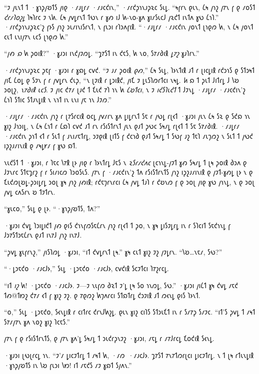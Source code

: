 “𐑲 𐑢𐑧𐑯𐑑 𐑑 ·𐑣𐑪𐑜𐑢𐑹𐑑𐑕 𐑢𐑦𐑞 ·𐑥𐑨𐑛𐑩𐑥 ·𐑥𐑨𐑤𐑒𐑦𐑯,” ·𐑥𐑩𐑒𐑜𐑪𐑯𐑨𐑜𐑷𐑤 𐑕𐑧𐑛. “𐑰𐑝𐑩𐑯 𐑞𐑧𐑯, 𐑖𐑰 𐑢𐑪𐑟 𐑢𐑳𐑯 𐑝 𐑞 𐑥𐑴𐑕𐑑 \emph{𐑒𐑩𐑥𐑐𐑴𐑟𐑛} 𐑐𐑰𐑐𐑩𐑤 𐑲 𐑯𐑿. 𐑖𐑰 𐑢𐑫𐑛𐑩𐑯𐑑 𐑑𐑻𐑯 𐑩 𐑣𐑺 𐑦𐑓 𐑿-𐑯𐑴-𐑣𐑵 𐑣𐑦𐑥𐑕𐑧𐑤𐑓 𐑢𐑷𐑒𐑑 𐑦𐑯𐑑𐑵 𐑣𐑻 𐑖𐑪𐑐.” ·𐑥𐑩𐑒𐑜𐑪𐑯𐑨𐑜𐑷𐑤'𐑟 𐑝𐑶𐑕 𐑢𐑪𐑟 𐑮𐑧𐑥𐑦𐑯𐑦𐑕𐑩𐑯𐑑, 𐑯 𐑝𐑧𐑮𐑦 𐑩𐑐𐑮𐑵𐑝𐑦𐑙. “·𐑥𐑨𐑛𐑩𐑥 ·𐑥𐑨𐑤𐑒𐑦𐑯 𐑢𐑴𐑯𐑑 𐑚𐑪𐑞𐑼 𐑿, 𐑯 𐑖𐑰 𐑢𐑴𐑯𐑑 𐑤𐑧𐑑 𐑧𐑯𐑦𐑢𐑳𐑯 𐑧𐑤𐑕 𐑚𐑪𐑞𐑼 𐑿.”

“𐑢𐑺 \emph{𐑸} 𐑿 𐑜𐑴𐑦𐑙?” ·𐑣𐑨𐑮𐑦 𐑦𐑯𐑒𐑢𐑲𐑼𐑛. “𐑡𐑳𐑕𐑑 𐑦𐑯 𐑒𐑱𐑕, 𐑿 𐑯𐑴, 𐑕𐑳𐑥𐑔𐑦𐑙 \emph{𐑛𐑳𐑟} 𐑣𐑨𐑐𐑩𐑯.”

·𐑥𐑩𐑒𐑜𐑪𐑯𐑨𐑜𐑷𐑤 𐑜𐑱𐑝 ·𐑣𐑨𐑮𐑦 𐑩 𐑣𐑸𐑛 𐑤𐑫𐑒. “𐑲 𐑨𐑥 𐑜𐑴𐑦𐑙 \emph{𐑞𐑺},” 𐑖𐑰 𐑕𐑧𐑛, 𐑐𐑶𐑯𐑑𐑦𐑙 𐑨𐑑 𐑩 𐑚𐑦𐑤𐑛𐑦𐑙 𐑩𐑒𐑮𐑪𐑕 𐑞 𐑕𐑑𐑮𐑰𐑑 𐑢𐑦𐑗 𐑖𐑴𐑛 𐑞 𐑕𐑲𐑯 𐑝 𐑩 𐑢𐑫𐑛𐑩𐑯 𐑒𐑧𐑜, “𐑯 𐑚𐑲𐑦𐑙 𐑩 𐑛𐑮𐑦𐑙𐑒, 𐑢𐑦𐑗 𐑲 𐑛𐑧𐑕𐑐𐑼𐑩𐑑𐑤𐑦 𐑯𐑰𐑛. \emph{𐑿} 𐑸 𐑑 𐑜𐑧𐑑 𐑓𐑦𐑑𐑩𐑛 𐑓 𐑘𐑹 𐑮𐑴𐑚𐑟, \emph{𐑯𐑳𐑔𐑦𐑙 𐑧𐑤𐑕}. 𐑲 𐑢𐑦𐑤 𐑒𐑳𐑥 𐑚𐑨𐑒 𐑑 𐑗𐑧𐑒 𐑳𐑐 𐑪𐑯 𐑿 \emph{𐑖𐑹𐑑𐑤𐑦}, 𐑯 𐑲 \emph{𐑦𐑒𐑕𐑐𐑧𐑒𐑑} 𐑑 𐑓𐑲𐑯𐑛 ·𐑥𐑨𐑛𐑩𐑥 ·𐑥𐑨𐑤𐑒𐑦𐑯'𐑟 𐑖𐑪𐑐 𐑕𐑑𐑦𐑤 𐑕𐑑𐑨𐑯𐑛𐑦𐑙 𐑯 𐑯𐑪𐑑 𐑦𐑯 𐑧𐑯𐑦 𐑢𐑱 𐑪𐑯 𐑓𐑲𐑼.”

·𐑥𐑨𐑛𐑩𐑥 ·𐑥𐑨𐑤𐑒𐑦𐑯 𐑢𐑪𐑟 𐑩 𐑚𐑳𐑕𐑩𐑤𐑦𐑙 𐑴𐑤𐑛 𐑢𐑫𐑥𐑩𐑯 𐑣𐑵 𐑛𐑦𐑛𐑩𐑯𐑑 𐑕𐑱 𐑩 𐑢𐑻𐑛 𐑩𐑚𐑬𐑑 ·𐑣𐑨𐑮𐑦 𐑢𐑧𐑯 𐑖𐑰 𐑕𐑷 𐑞 𐑕𐑒𐑸 𐑪𐑯 𐑣𐑦𐑟 𐑓𐑪𐑮𐑦𐑛, 𐑯 𐑖𐑰 𐑖𐑪𐑑 𐑩 𐑖𐑸𐑐 𐑤𐑫𐑒 𐑨𐑑 𐑩𐑯 𐑩𐑕𐑦𐑕𐑑𐑩𐑯𐑑 𐑢𐑧𐑯 𐑞𐑨𐑑 𐑜𐑻𐑤 𐑕𐑰𐑥𐑛 𐑩𐑚𐑬𐑑 𐑑 𐑕𐑱 𐑕𐑳𐑥𐑔𐑦𐑙. ·𐑥𐑨𐑛𐑩𐑥 ·𐑥𐑨𐑤𐑒𐑦𐑯 𐑜𐑪𐑑 𐑬𐑑 𐑩 𐑕𐑧𐑑 𐑝 𐑨𐑯𐑦𐑥𐑱𐑑𐑩𐑛, 𐑮𐑲𐑞𐑦𐑙 𐑚𐑦𐑑𐑕 𐑝 𐑒𐑤𐑪𐑔 𐑞𐑨𐑑 𐑕𐑰𐑥𐑛 𐑑 𐑕𐑻𐑝 𐑨𐑟 𐑑𐑱𐑐 𐑥𐑧𐑠𐑼𐑟 𐑯 𐑕𐑧𐑑 𐑑 𐑢𐑻𐑒 𐑦𐑜𐑟𐑨𐑥𐑦𐑯𐑦𐑙 𐑞 𐑥𐑰𐑛𐑾𐑥 𐑝 𐑣𐑻 𐑸𐑑.

𐑯𐑧𐑒𐑕𐑑 𐑑 ·𐑣𐑨𐑮𐑦, 𐑩 𐑐𐑱𐑤 𐑘𐑳𐑙 𐑚𐑶 𐑢𐑦𐑞 𐑩 𐑐𐑶𐑯𐑑𐑩𐑛 𐑓𐑱𐑕 𐑯 \emph{𐑷𐑕𐑩𐑥𐑒𐑵𐑤} 𐑚𐑤𐑪𐑯𐑛-𐑢𐑲𐑑 𐑣𐑺 𐑕𐑰𐑥𐑛 𐑑 𐑚𐑰 𐑜𐑴𐑦𐑙 𐑔𐑮𐑵 𐑞 𐑓𐑲𐑯𐑩𐑤 𐑕𐑑𐑱𐑡𐑩𐑟 𐑝 𐑩 𐑕𐑦𐑥𐑦𐑤𐑼 𐑐𐑮𐑴𐑕𐑧𐑕. 𐑢𐑳𐑯 𐑝 ·𐑥𐑨𐑤𐑒𐑦𐑯'𐑟 𐑑𐑵 𐑩𐑕𐑦𐑕𐑑𐑩𐑯𐑑𐑕 𐑢𐑪𐑟 𐑦𐑜𐑟𐑨𐑥𐑦𐑯𐑦𐑙 𐑞 𐑢𐑲𐑑-𐑣𐑺𐑛 𐑚𐑶 𐑯 𐑞 𐑗𐑧𐑒𐑼𐑚𐑹𐑛-𐑜𐑮𐑦𐑛𐑩𐑛 𐑮𐑴𐑚 𐑣𐑰 𐑢𐑪𐑟 𐑢𐑺𐑦𐑙; 𐑩𐑒𐑱𐑠𐑩𐑯𐑩𐑤𐑦 𐑖𐑰 𐑢𐑫𐑛 𐑑𐑨𐑐 𐑩 𐑒𐑹𐑯𐑼 𐑝 𐑞 𐑮𐑴𐑚 𐑢𐑦𐑞 𐑣𐑻 𐑢𐑪𐑯𐑛, 𐑯 𐑞 𐑮𐑴𐑚 𐑢𐑫𐑛 𐑤𐑵𐑕𐑩𐑯 𐑹 𐑑𐑲𐑑𐑩𐑯.

“𐑣𐑧𐑤𐑴,” 𐑕𐑧𐑛 𐑞 𐑚𐑶. “·𐑣𐑪𐑜𐑢𐑹𐑑𐑕, 𐑑𐑵?”

·𐑣𐑨𐑮𐑦 𐑒𐑫𐑛 𐑐𐑮𐑦𐑛𐑦𐑒𐑑 𐑢𐑺 𐑞𐑦𐑕 𐑒𐑪𐑯𐑝𐑼𐑕𐑱𐑖𐑩𐑯 𐑢𐑪𐑟 𐑩𐑚𐑬𐑑 𐑑 𐑜𐑴, 𐑯 𐑣𐑰 𐑛𐑦𐑕𐑲𐑛𐑩𐑛 𐑦𐑯 𐑩 𐑕𐑐𐑤𐑦𐑑 𐑕𐑱𐑒𐑪𐑯𐑛 𐑝 𐑓𐑮𐑳𐑕𐑑𐑮𐑱𐑖𐑩𐑯 𐑞𐑨𐑑 𐑦𐑯𐑳𐑓 𐑢𐑪𐑟 𐑦𐑯𐑳𐑓.

“𐑜𐑫𐑛 𐑣𐑧𐑝𐑩𐑯𐑟,” 𐑢𐑦𐑕𐑐𐑼𐑛 ·𐑣𐑨𐑮𐑦, “𐑦𐑑 𐑒𐑫𐑛𐑩𐑯𐑑 𐑚𐑰.” 𐑣𐑰 𐑤𐑧𐑑 𐑣𐑦𐑟 𐑲𐑟 𐑢𐑲𐑛𐑩𐑯. “𐑘𐑹…𐑯𐑱𐑥, 𐑕𐑻?”

“·𐑛𐑮𐑱𐑒𐑴 ·𐑥𐑨𐑤𐑓𐑶,” 𐑕𐑧𐑛 ·𐑛𐑮𐑱𐑒𐑴 ·𐑥𐑨𐑤𐑓𐑶, 𐑤𐑫𐑒𐑦𐑙 𐑕𐑤𐑲𐑑𐑤𐑦 𐑐𐑳𐑟𐑩𐑤𐑛.

“𐑦𐑑 \emph{𐑦𐑟} 𐑿! ·𐑛𐑮𐑱𐑒𐑴 ·𐑥𐑨𐑤𐑓𐑶. 𐑲—𐑲 𐑯𐑧𐑝𐑼 𐑔𐑷𐑑 𐑲'𐑛 𐑚𐑰 𐑕𐑴 𐑪𐑯𐑼𐑛, 𐑕𐑻.” ·𐑣𐑨𐑮𐑦 𐑢𐑦𐑖𐑑 𐑣𐑰 𐑒𐑫𐑛 𐑥𐑱𐑒 𐑑𐑺@𐑑𐑽𐑟 𐑒𐑳𐑥 𐑬𐑑 𐑝 𐑣𐑦𐑟 𐑲𐑟. 𐑞 𐑳𐑞𐑼𐑟 𐑿𐑠𐑵𐑩𐑤𐑦 𐑕𐑑𐑸𐑑𐑩𐑛 𐑒𐑮𐑲𐑦𐑙 𐑨𐑑 𐑼𐑬𐑯𐑛 𐑞𐑦𐑕 𐑐𐑶𐑯𐑑.

“𐑴,” 𐑕𐑧𐑛 ·𐑛𐑮𐑱𐑒𐑴, 𐑕𐑬𐑯𐑛𐑦𐑙 𐑩 𐑤𐑦𐑑𐑩𐑤 𐑒𐑩𐑯𐑓𐑿𐑟𐑛. 𐑞𐑧𐑯 𐑣𐑦𐑟 𐑤𐑦𐑐𐑕 𐑕𐑑𐑮𐑧𐑗𐑑 𐑦𐑯 𐑩 𐑕𐑥𐑳𐑜 𐑕𐑥𐑲𐑤. “𐑦𐑑'𐑕 𐑜𐑫𐑛 𐑑 𐑥𐑰𐑑 𐑕𐑳𐑥𐑢𐑳𐑯 𐑣𐑵 𐑯𐑴𐑟 𐑣𐑦𐑟 𐑐𐑤𐑱𐑕.”

𐑢𐑳𐑯 𐑝 𐑞 𐑩𐑕𐑦𐑕𐑑𐑩𐑯𐑑𐑕, 𐑞 𐑢𐑳𐑯 𐑣𐑵'𐑛 𐑕𐑰𐑥𐑛 𐑑 𐑮𐑧𐑒𐑩𐑜𐑯𐑲𐑟 ·𐑣𐑨𐑮𐑦, 𐑥𐑱𐑛 𐑩 𐑥𐑳𐑓𐑩𐑤𐑛 𐑗𐑴𐑒𐑦𐑙 𐑕𐑬𐑯𐑛.

·𐑣𐑨𐑮𐑦 𐑚𐑻𐑚𐑩𐑤𐑛 𐑪𐑯. “𐑲'𐑥 𐑛𐑦𐑤𐑲𐑑𐑩𐑛 𐑑 𐑥𐑰𐑑 𐑿, ·𐑥𐑼~·𐑥𐑨𐑤𐑓𐑶. 𐑡𐑳𐑕𐑑 𐑳𐑯𐑳𐑑𐑼𐑩𐑚𐑤𐑦 𐑛𐑦𐑤𐑲𐑑𐑩𐑛. 𐑯 𐑑 𐑚𐑰 𐑩𐑑𐑧𐑯𐑛𐑦𐑙 ·𐑣𐑪𐑜𐑢𐑹𐑑𐑕 𐑦𐑯 𐑘𐑹 𐑝𐑧𐑮𐑦 𐑘𐑽! 𐑦𐑑 𐑥𐑱𐑒𐑕 𐑥𐑲 𐑣𐑸𐑑 𐑕𐑢𐑵𐑯.”

